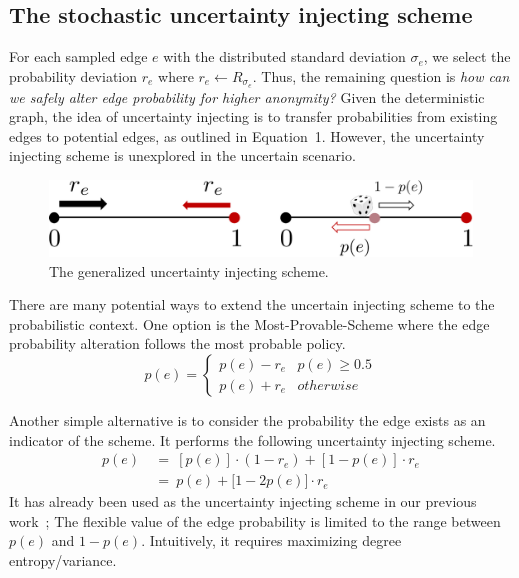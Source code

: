\subsection{The stochastic uncertainty injecting scheme}
For each sampled edge $e$ with the distributed standard deviation $\sigma_{e}$, we select the probability deviation $r_{e}$ where $r_{e} \leftarrow R_{\sigma_{e}}$. 
Thus, the remaining question is \emph{how can we safely alter edge probability for higher anonymity?}
Given the deterministic graph, the idea of uncertainty injecting is to transfer probabilities from existing edges to potential edges, as outlined in Equation~1.
However, the uncertainty injecting scheme is unexplored in the uncertain scenario.  
\begin{figure}[!htb]
  \centering
        \includegraphics[width=\linewidth]{ill/shift_UI.pdf}
    \caption{The generalized uncertainty injecting scheme.}
\end{figure}
There are many potential ways to extend the uncertain injecting scheme to the probabilistic context.   
One option is the Most-Provable-Scheme where the edge probability alteration follows the most probable policy.
\begin{equation*}
  p(e) =
  \begin{cases}
     p(e)-r_{e}    & p(e) \ge 0.5 \\
     p(e)+r_{e}    & otherwise 
  \end{cases}
  \label{eq:inject}
\end{equation*}

Another simple alternative is to consider the probability the edge exists as an indicator of the scheme. 
It performs the following uncertainty injecting scheme.
\begin{align}
  p(e)~&=~ [p(e)] \cdot (1-r_{e})+ [1-p(e)] \cdot r_{e} \\
      ~&=~ p(e) + \big[ 1- 2 p(e) \big] \cdot r_{e}
  \label{eq:ui}
\end{align}
It has already been used as the uncertainty injecting scheme in our previous work~\cite{Xiao:2018}; 
The flexible value of the edge probability is limited to the range between $p(e)$ and $1-p(e)$.
Intuitively, it requires maximizing degree entropy/variance. 

